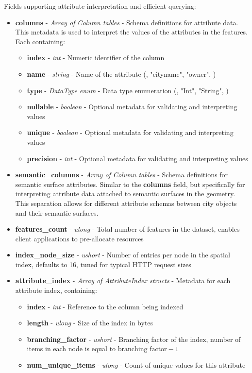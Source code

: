 Fields supporting attribute interpretation and efficient querying:

\begin{itemize}
  \item \textbf{columns} - \textit{Array of Column tables} - Schema definitions for attribute data. This metadata is used to interpret the values of the attributes in the features. Each containing:
    \begin{itemize}
      \item \textbf{index} - \textit{int} - Numeric identifier of the column
      \item \textbf{name} - \textit{string} - Name of the attribute (\eg, "cityname", "owner", \etc)
      \item \textbf{type} - \textit{DataType enum} - Data type enumeration (\eg, "Int", "String", \etc)
      \item \textbf{nullable} - \textit{boolean} - Optional metadata for validating and interpreting values
      \item \textbf{unique} - \textit{boolean} - Optional metadata for validating and interpreting values
      \item \textbf{precision} - \textit{int} - Optional metadata for validating and interpreting values
    \end{itemize}

  \item \textbf{semantic\_columns} - \textit{Array of Column tables} - Schema definitions for semantic surface attributes. Similar to the \textbf{columns} field, but specifically for interpreting attribute data attached to semantic surfaces in the geometry. This separation allows for different attribute schemas between city objects and their semantic surfaces.

  \item \textbf{features\_count} - \textit{ulong} - Total number of features in the dataset, enables client applications to pre-allocate resources

  \item \textbf{index\_node\_size} - \textit{ushort} - Number of entries per node in the spatial index, defaults to 16, tuned for typical HTTP request sizes

  \item \textbf{attribute\_index} - \textit{Array of AttributeIndex structs} - Metadata for each attribute index, containing:
    \begin{itemize}
      \item \textbf{index} - \textit{int} - Reference to the column being indexed
      \item \textbf{length} - \textit{ulong} - Size of the index in bytes
      \item \textbf{branching\_factor} - \textit{ushort} - Branching factor of the index, number of items in each node is equal to $\text{branching factor} - 1$
      \item \textbf{num\_unique\_items} - \textit{ulong} - Count of unique values for this attribute
    \end{itemize}
\end{itemize}

